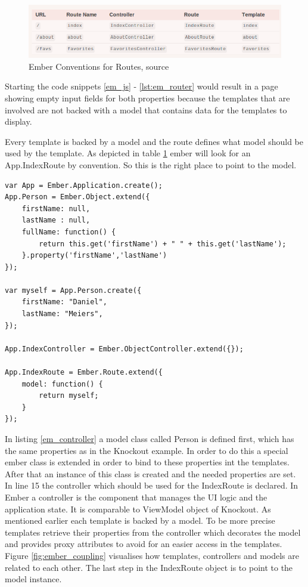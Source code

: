 \begin{figure}
	\centering	\includegraphics[width=1.0\textwidth]{./img/tech-ana/ember_routes_conventions.png}
	\caption{Ember Conventions for Routes, source \autocite{tech-ana:em-routes-coc}}
	\label{fig:ember_routes}
\end{figure}

Starting the code snippets \ref{em_js} - \ref{lst:em_router} would result in a page showing empty input fields for both properties because the templates that are involved are not backed with a model that contains data for the templates to display.

Every template is backed by a model and the route defines what model should be used by the template.
As depicted in table \ref{fig:ember_routes} ember will look for an App.IndexRoute by convention. So this is the right place to point to the model.

\begin{lstlisting}[label=em_controller,caption=app.js]
var App = Ember.Application.create();
App.Person = Ember.Object.extend({
	firstName: null,
	lastName : null,
    fullName: function() {
        return this.get('firstName') + " " + this.get('lastName');
    }.property('firstName','lastName')
});

var myself = App.Person.create({
    firstName: "Daniel",
    lastName: "Meiers",
});

App.IndexController = Ember.ObjectController.extend({});

App.IndexRoute = Ember.Route.extend({
    model: function() {
        return myself;
    }
});
\end{lstlisting}

In listing \ref{em_controller} a model class called Person is defined first, which has the same properties as in the Knockout example.
In order to do this a special ember class is extended in order to bind to these properties int the templates.
After that an instance of this class is created and the needed properties are set.
In line 15 the controller which should be used for the IndexRoute is declared.
In Ember a controller is the component that manages the UI logic and the application state.
It is comparable to ViewModel object of Knockout.
As mentioned earlier each template is backed by a model.
To be more precise templates retrieve their properties from the controller which decorates the model and provides proxy attributes to avoid for an easier access in the templates. Figure \ref{fig:ember_coupling} visualises how templates, controllers and models are related to each other.
The last step in the IndexRoute object is to point to the model instance.


